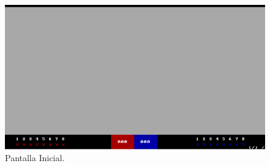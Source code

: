 \begin{figure}[ht!]
\centering
\includegraphics[width=120mm]{imagenes/pantalla.png}
\caption{Pantalla Inicial.}
\end{figure}